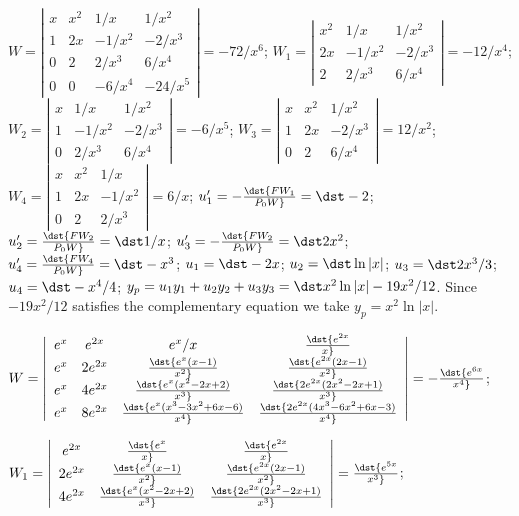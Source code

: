 \documentclass[dvips]{book}
\renewcommand{\exer}[1]{\par\medskip\;\noindent{\color{red}\bf #1.}}
\numberwithin{example}{section}
\numberwithin{equation}{section}
\numberwithin{theorem}{section}
\numberwithin{table}{section}
\numberwithin{figure}{section}
\begin{document}
\exer{9.4.18}
$W=\left|\begin{array}{cccc}
x&x^2&1/x&1/x^2\\
1&2x&-1/x^2&-2/x^3\\
0&2&2/x^3&6/x^4\\0&0&-6/x^4&-24/x^5
\end{array}\right|=-72/x^6$;
$W_1=\left|\begin{array}{cccc}
x^2&1/x&1/x^2\\2x&-1/x^2&-2/x^3
\\2&2/x^3&6/x^4\end
{array}\right|=-12/x^4$;
$W_2=\left|\begin{array}{cccc}
x&1/x&1/x^2\\1&-1/x^2&-2/x^3\\
0&2/x^3&6/x^4\end{array}\right|=-6/x^5$;
$W_3=\left|\begin{array}{cccc}
x&x^2&1/x^2\\1&2x&-2/x^3\\
0&2&6/x^4\end{array}\right|=12/x^2$;
$W_4=\left|\begin{array}{cccc}
x&x^2&1/x\\1&2x&-1/x^2\\
0&2&2/x^3\end{array}\right|=6/x$;
$u_1'=-\dst{FW_1\over P_0W}=\dst-2$;
$u_2'=\dst{FW_2\over P_0W}=\dst 1/x$;
$u_3'=-\dst{FW_2\over P_0W}=\dst2x^2$;
$u_4'=\dst{FW_4\over P_0W}=\dst-x^3$;
$u_1=\dst-2x$;
$u_2=\dst\ln|x|$;
$u_3=\dst2x^3/3$;
$u_4=\dst-x^4/4$;
$y_p=u_1y_1+u_2y_2+u_3y_3=\dst x^2\ln|x|-19x^2/12$.
Since $-19x^2/12$ satisfies the complementary equation we take
$y_p= x^2\ln|x|$.


\exer{9.4.20}
$W=\left|\begin{array}{cccc}
e^x&e^{2x}&e^x/x&\dst{e^{2x}\over x}\\
e^x&2e^{2x}&\dst{e^x(x-1)\over x^2}&\dst{e^{2x}(2x-1)\over x^2}\\
e^x&4e^{2x}&\dst{e^x(x^2-2x+2)\over
x^3}&\dst{2e^{2x}(2x^2-2x+1)\over x^3}\\
e^x&8e^{2x}&\dst{e^x(x^3-3x^2+6x-6)\over x^4}
&\dst{2e^{2x}(4x^3-6x^2+6x-3)\over x^4}
\end{array}\right|=-\dst{e^{6x}\over x^4}$;

$W_1=\left|\begin{array}{cccc}
e^{2x}&\dst{e^x\over x}&\dst{e^{2x}\over x}\\
2e^{2x}&\dst{e^x(x-1)\over x^2}&\dst{e^{2x}(2x-1)\over x^2}\\
4e^{2x}&\dst{e^x(x^2-2x+2)\over x^3}&\dst{2e^{2x}(2x^2-2x+1)\over x^3}
\end{array}\right|=\dst{e^{5x}\over x^3}$;
\end{document}

